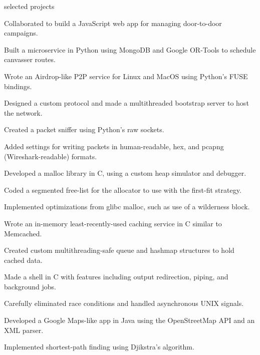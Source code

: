 \documentclass{cv}
\begin{document}
\begin{cvsection}{selected projects}
  {
    \item Collaborated to build a JavaScript web app for managing door-to-door campaigns.
    \item Built a microservice in Python using MongoDB and Google OR-Tools to schedule canvasser routes.
  }
  {
    \item Wrote an Airdrop-like P2P service for Linux and MacOS using Python's FUSE bindings.
    \item Designed a custom protocol and made a multithreaded bootstrap server to host the network.
  }
  {
    \item Created a packet sniffer using Python's raw sockets.
    \item Added settings for writing packets in human-readable, hex, and pcapng (Wireshark-readable) formats.
  }
  {
    \item Developed a malloc library in C, using a custom heap simulator and debugger.
    \item Coded a segmented free-list for the allocator to use with the first-fit strategy.
    \item Implemented optimizations from glibc malloc, such as use of a wilderness block.
  }
  {
    \item Wrote an in-memory least-recently-used caching service in C similar to Memcached.
    \item Created custom multithreading-safe queue and hashmap structures to hold cached data.
  }
  {
    \item Made a shell in C with features including output redirection, piping, and background jobs. 
    \item Carefully eliminated race conditions and handled asynchronous UNIX signals.
  }
  {
    \item Developed a Google Maps-like app in Java using the OpenStreetMap API and an XML parser.
    \item Implemented shortest-path finding using Djikstra's algorithm.
  }
\end{cvsection}
\end{document}
